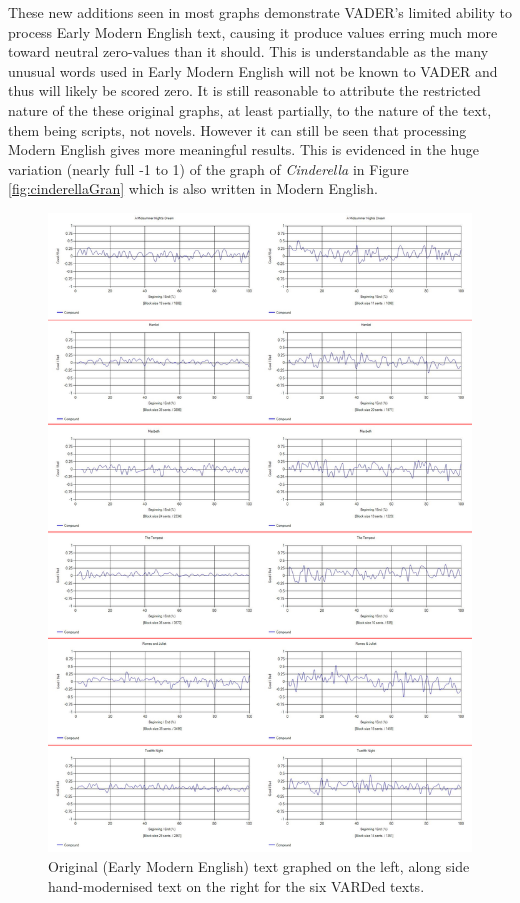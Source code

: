 \documentclass{article}
\begin{document}
{        These new additions seen in most graphs demonstrate VADER's limited ability to process Early Modern English text, causing it produce values erring much more toward neutral zero-values than it should. This is understandable as the many unusual words used in Early Modern English will not be known to VADER and thus will likely be scored zero. It is still reasonable to attribute the restricted nature of the these original graphs, at least partially, to the nature of the text, them being scripts, not novels. However it can still be seen that processing Modern English gives more meaningful results. This is evidenced in the huge variation (nearly full -1 to 1) of the graph of \textit{Cinderella} in Figure \ref{fig:cinderellaGran} which is also written in Modern English.
        \begin{figure}
            \includegraphics[width=1\textwidth]{Figures/EMvsM/EMvsMAll}
            \centering
            \caption{Original (Early Modern English) text graphed on the left, along side hand-modernised text on the right for the six VARDed texts.}
            \label{fig:emvsm}
        \end{figure}
\newpage
}
\end{document}
